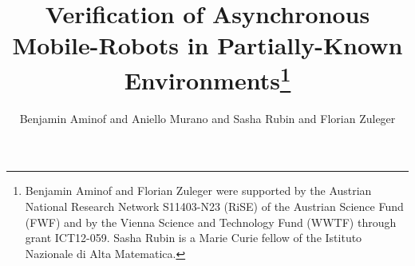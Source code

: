 \documentclass{llncs}
\begin{document}
\title{Verification of Asynchronous Mobile-Robots in Partially-Known Environments\thanks{Benjamin Aminof and Florian Zuleger were supported by the Austrian National Research Network S11403-N23 (RiSE) of the Austrian Science Fund (FWF) and by the Vienna Science and Technology Fund (WWTF) through grant ICT12-059.  Sasha Rubin is a Marie Curie fellow of the Istituto Nazionale di Alta Matematica.}}



\author{Benjamin Aminof and Aniello Murano and Sasha Rubin and Florian Zuleger}

\newcommand{\cm}{\ensuremath{\mathfrak{M}}}


\maketitle
\end{document}
